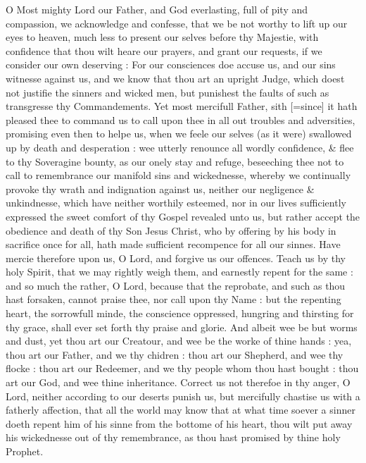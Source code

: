 O
Most mighty Lord our Father, and God everlasting, full of pity and compassion,
we acknowledge and confesse, that we be not worthy to lift up our eyes
to heaven, much less to present our selves before thy Majestie, with confidence
that thou wilt heare our prayers, and grant our requests, if we consider
our own deserving : For our consciences doe accuse us, and our sins witnesse
against us, and we know that thou art an upright Judge, which doest not
justifie the sinners and wicked men, but punishest the faults of such
as transgresse thy Commandements. Yet most mercifull Father, sith [=since]
it hath pleased thee to command us to call upon thee in all out troubles
and adversities, promising even then to helpe us, when we feele our selves
(as it were) swallowed up by death and desperation : wee utterly renounce
all wordly confidence, \& flee to thy Soveragine bounty, as our onely
stay and refuge, beseeching thee not to call to remembrance our manifold
sins and wickednesse, whereby we continually provoke thy wrath and indignation
against us, neither our negligence \& unkindnesse, which have neither
worthily esteemed, nor in our lives sufficiently expressed the sweet comfort
of thy Gospel revealed unto us, but rather accept the obedience and death
of thy Son Jesus Christ, who by offering by his body in sacrifice once
for all, hath made sufficient recompence for all our sinnes. Have mercie
therefore upon us, O Lord, and forgive us our offences. Teach us by thy
holy Spirit, that we may rightly weigh them, and earnestly repent for
the same : and so much the rather, O Lord, because that the reprobate,
and such as thou hast forsaken, cannot praise thee, nor call upon thy
Name : but the repenting heart, the sorrowfull minde, the conscience oppressed,
hungring and thirsting for thy grace, shall ever set forth thy praise
and glorie. And albeit wee be but worms and dust, yet thou art our Creatour,
and wee be the worke of thine hands : yea, thou art our Father, and we
thy chidren : thou art our Shepherd, and wee thy flocke : thou art our
Redeemer, and we thy people whom thou hast bought : thou art our God,
and wee thine inheritance. Correct us not therefoe in thy anger, O Lord,
neither according to our deserts punish us, but mercifully chastise us
with a fatherly affection, that all the world may know that at what time
soever a sinner doeth repent him of his sinne from the bottome of his
heart, thou wilt put away his wickednesse out of thy remembrance, as thou
hast promised by thine holy Prophet.

